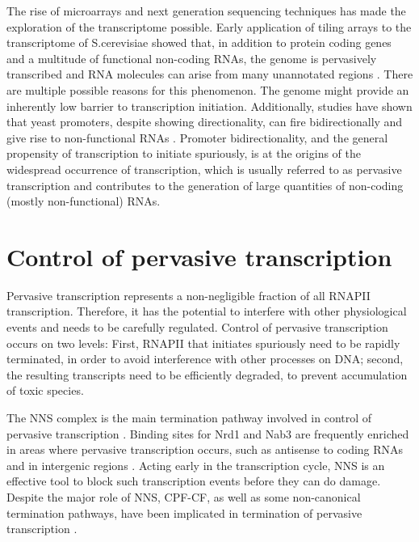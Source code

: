 

The rise of microarrays and next generation sequencing techniques has made the exploration of the transcriptome possible. 
Early application of tiling arrays to the transcriptome of S.cerevisiae showed that, in addition to protein coding genes and a multitude of functional non-coding RNAs, the genome is pervasively transcribed and RNA molecules can arise from many unannotated regions \cite{xu:2009:bidirectional, neil:2009:widespread,david:2006:highresolution}. 
There are multiple possible reasons for this phenomenon. 
The genome might provide an inherently low barrier to transcription initiation. 
Additionally, studies have shown that yeast promoters, despite showing directionality, can fire bidirectionally and give rise to non-functional RNAs \cite{xu:2009:bidirectional, neil:2009:widespread}. 
Promoter bidirectionality, and the general propensity of transcription to initiate spuriously, is at the origins of the widespread occurrence of transcription, which is usually referred to as pervasive transcription and contributes to the generation of large quantities of non-coding (mostly non-functional) RNAs. 

\section{Control of pervasive transcription}

Pervasive transcription represents a non-negligible fraction of all RNAPII transcription. 
Therefore, it has the potential to interfere with other physiological events and needs to be carefully regulated. 
Control of pervasive transcription occurs on two levels: First, RNAPII that initiates spuriously need to be rapidly terminated, in order to avoid interference with other processes on DNA; second, the resulting transcripts need to be efficiently degraded, to prevent accumulation of toxic species. 

The NNS complex is the main termination pathway involved in control of pervasive transcription \cite{arigo:2006:regulation, thiebaut:2006:transcription}. 
Binding sites for Nrd1 and Nab3 are frequently enriched in areas where pervasive transcription occurs, such as antisense to coding RNAs and in intergenic regions \cite{thiebaut:2006:transcription}. 
Acting early in the transcription cycle, NNS is an effective tool to block such transcription events before they can do damage. 
Despite the major role of NNS, CPF-CF, as well as some non-canonical termination pathways, have been implicated in termination of pervasive transcription \cite{marquardt:2011:distinct, vandijk:2011:xuts,colin:2014:roadblock}.

